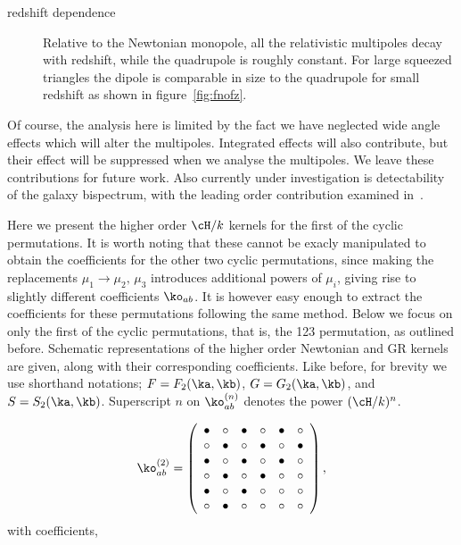 {\begin{description}
%
\item[redshift dependence] Relative to the Newtonian monopole, all the relativistic multipoles decay with redshift, while the quadrupole is roughly constant. For large squeezed triangles the dipole is comparable in size to the quadrupole for small redshift as shown in figure~\ref{fig:fnofz}.
%
\end{description}
Of course, the analysis here is limited by the fact we have neglected wide angle effects which will alter the multipoles.  Integrated effects will also contribute, but their effect will be suppressed when we analyse the multipoles. We leave these contributions for future work. Also currently under investigation is detectability of the galaxy bispectrum, with the leading order contribution examined in~\cite{Maartens:2019yhx}.


%
Here we present the higher order \(\cH/k\) kernels for the first of the cyclic permutations. It is worth noting that these cannot be exacly manipulated to obtain the coefficients for the other two cyclic permutations, since making the replacements \(\mu_1 \to \mu_2, \, \mu_3\) introduces additional powers of \(\mu_i\), giving rise to slightly different coefficients \(\ko_{ab}\). It is however easy enough to extract the coefficients for these permutations following the same method. Below we focus on only the first of the cyclic permutations, that is, the 123 permutation, as outlined before. Schematic representations of the higher order Newtonian and GR kernels are given, along with their corresponding coefficients. Like before, for brevity we use shorthand notations; \(F = F_2(\ka,\kb)\), \(G = G_2(\ka,\kb)\), and \(S = S_2(\ka,\kb)\). Superscript \(n\) on \(\ko_{ab}^{(n)}\) denotes the power \((\cH/k)^n\).

\begin{equation}
\ko_{ab}^{(2)} =  \left( \begin {array}{cccccc} \bullet &\circ &\bullet &\circ 
&\bullet &\circ \\  \circ &\bullet &\circ &
\bullet &\circ &\bullet \\  \bullet &\circ 
&\bullet &\circ &\bullet &\circ \\  \circ &
\bullet &\circ &\bullet &\circ &\circ \\  
\bullet &\circ &\bullet &\circ &\circ &\circ 
\\  \circ &\bullet &\circ &\circ &\circ &
\circ \end {array} \right),
\end{equation}
with coefficients, 

}
